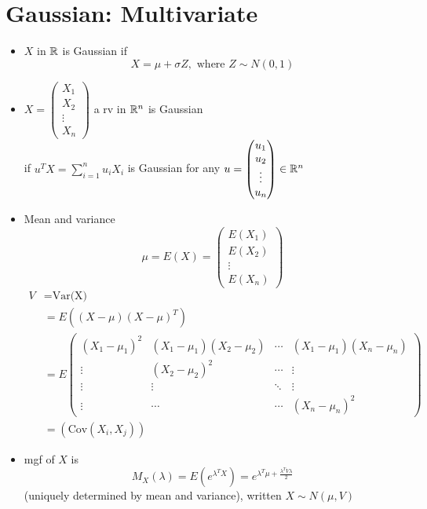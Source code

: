 \section{Gaussian: Multivariate}
\begin{itemize}
      \item $X$ in $\mathbb{R}$ is Gaussian if \[X = \mu+\sigma Z, \text{ where } Z \sim N(0,1)\]
      \item $X = \begin{pmatrix} X_1 \\ X_2 \\ \vdots \\ X_n \end{pmatrix}$ a rv in $\mathbb{R}^n$ is Gaussian \\
            if $ u^T X = \sum_{i=1}^n u_i X_i  $ is Gaussian for any $u  = \begin{pmatrix} u_1 \\ u_2 \\ \vdots \\ u_n \end{pmatrix} \in \mathbb{R}^n$
      \item Mean and variance \[\mu = E(X) = \begin{pmatrix} E(X_1) \\ E(X_2) \\ \vdots \\ E(X_n) \end{pmatrix} \]
            \begin{align*}
                  V & = \text{Var(X)}
                  \\ &= E((X-\mu)(X-\mu)^T)
                  \\ &=  E \begin{pmatrix}
                        (X_1-\mu_1)^2 & (X_1-\mu_1)(X_2-\mu_2) & \cdots & (X_1-\mu_1)(X_n-\mu_n) \\
                        \vdots        & (X_2-\mu_2)^2          & \cdots & \vdots                 \\
                        \vdots        & \vdots                 & \ddots & \vdots                 \\
                        \vdots        & \cdots                 & \cdots & (X_n-\mu_n)^2
                  \end{pmatrix}
                  \\ &= (\text{Cov}(X_i,X_j))
            \end{align*}
      \item mgf of $X$ is \[M_X(\lambda) = E(e^{\lambda^T X}) = e^{\lambda^T \mu + \frac{\lambda^T V \lambda}{2}}\] (uniquely determined by mean and variance), written $X \sim N(\mu, V)$

\end{itemize}
